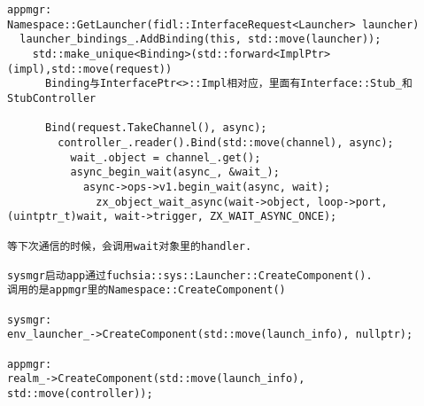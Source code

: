 \begin{verbatim}
appmgr:
Namespace::GetLauncher(fidl::InterfaceRequest<Launcher> launcher)
  launcher_bindings_.AddBinding(this, std::move(launcher));
    std::make_unique<Binding>(std::forward<ImplPtr>(impl),std::move(request))
      Binding与InterfacePtr<>::Impl相对应，里面有Interface::Stub_和StubController

      Bind(request.TakeChannel(), async);
        controller_.reader().Bind(std::move(channel), async);
          wait_.object = channel_.get();
          async_begin_wait(async_, &wait_);
            async->ops->v1.begin_wait(async, wait);
              zx_object_wait_async(wait->object, loop->port, (uintptr_t)wait, wait->trigger, ZX_WAIT_ASYNC_ONCE);

等下次通信的时候，会调用wait对象里的handler.

sysmgr启动app通过fuchsia::sys::Launcher::CreateComponent().  
调用的是appmgr里的Namespace::CreateComponent()

sysmgr:
env_launcher_->CreateComponent(std::move(launch_info), nullptr);

appmgr:
realm_->CreateComponent(std::move(launch_info), std::move(controller));

\end{verbatim}
